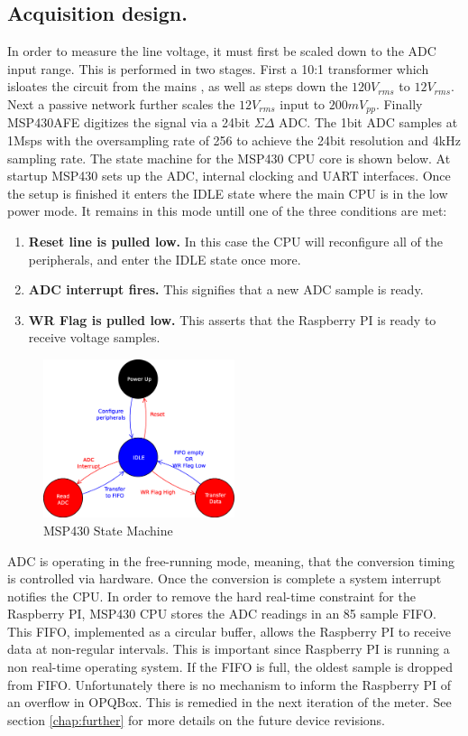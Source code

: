 \subsection{Acquisition design.}
In order to measure the line voltage, it must first be scaled down to the ADC input range. This is performed in two stages. First a 10:1 transformer which isloates the circuit from the mains
, as well as steps down the $120V_{rms}$ to $12V_{rms}$. Next a passive network further scales the $12V_{rms}$ input to $200mV_{pp}$. Finally MSP430AFE digitizes the signal via a 24bit $\Sigma\Delta$
ADC. The 1bit ADC samples at 1Msps with the oversampling rate of 256 to achieve the 24bit resolution and 4kHz sampling rate. The state machine for the MSP430 CPU core is shown below.
	At startup MSP430 sets up the ADC, internal clocking and UART interfaces. Once the setup is finished it enters the IDLE state where the main CPU is in the low power mode. It remains in this mode
untill one of the three conditions are met:
\begin{enumerate}
\item \textbf{Reset line is pulled low.} In this case the CPU will reconfigure all of the peripherals, and enter the IDLE state once more.
\item \textbf{ADC interrupt fires.} This signifies that a new ADC sample is ready.
\item \textbf{WR Flag is pulled low.} This asserts that the Raspberry PI is ready to receive voltage samples.
\end{enumerate}

\begin{figure}[h!]
\centering
\includegraphics[width=0.5\textwidth]{img/MSP430StateMachine.eps}
\caption{MSP430 State Machine}
\end{figure}

ADC is operating in the free-running mode, meaning, that the conversion timing is controlled via hardware. Once the conversion is complete a system interrupt notifies the CPU.
In order to remove the hard real-time constraint for the Raspberry PI, MSP430 CPU stores the ADC readings in an 85 sample FIFO. This FIFO, implemented as a circular buffer, 
allows the Raspberry PI to receive data at non-regular intervals. This is important since Raspberry PI is running a non real-time operating system. If the FIFO is full, the oldest sample
is dropped from FIFO. Unfortunately there is no mechanism to inform the Raspberry PI of an overflow in OPQBox. This is remedied in the next iteration of the meter. See section \ref{chap:further}
for more details on the future device revisions.

